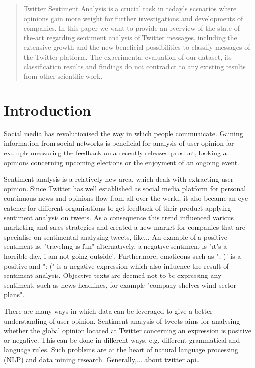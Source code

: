 \documentclass{sig-alternate}
\begin{document}
\maketitle
\begin{abstract}
Twitter Sentiment Analysis is a crucial task in today's scenarios where opinions gain more weight for further investigations and developments of companies. In this paper we want to provide an overview of the state-of-the-art regarding sentiment analysis of Twitter messages, including the extensive growth and the new beneficial possibilities to classify messages of the Twitter platform. The experimental evaluation of our dataset,  its classification results and findings do not contradict to any existing results from other scientific work.
\end{abstract}

\section{Introduction}
Social media has revolutionised the way in which people communicate. Gaining information from social networks is beneficial for analysis of user opinion for example measuring the feedback on a recently released product, looking at opinions concerning upcoming elections or the enjoyment of an ongoing event. 

Sentiment analysis is a relatively new area, which deals with extracting user opinion. Since Twitter has well established as social media platform for personal continuous news and opinions flow from all over the world, it also became an eye catcher for different organisations to get feedback of their product applying sentiment analysis on tweets. As a consequence this trend influenced various marketing and sales strategies and created a new market for companies that are specialise on sentimental analysing tweets, like... An example of a positive sentiment is, "traveling is fun" alternatively, a negative sentiment is "it's a horrible day, i am not going outside". Furthermore, emoticons such as ":-)" is a positive and ":-(" is a negative expression which also influence the result of sentiment analysis. Objective texts are deemed not to be expressing any sentiment, such as news headlines, for example "company shelves wind sector plans".

There are many ways in which data can be leveraged to give a better understanding of user opinion. Sentiment analysis of tweets aims for analysing whether the global opinion located at Twitter concerning an expression is positive or negative. This can be done in different ways, e.g. different grammatical and language rules. Such problems are at the heart of natural language processing (NLP) and data mining research.
Generally,... about twitter api..
\end{document}

